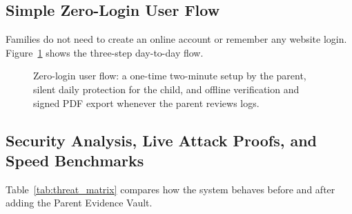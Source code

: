 \documentclass[11pt,a4paper]{article}
\begin{document}
\subsection{Simple Zero-Login User Flow}
Families do not need to create an online account or remember any website login. Figure~\ref{fig:user_flow} shows the three-step day-to-day flow.

\begin{figure}[H]
  \centering
  \resizebox{\textwidth}{!}{}
  \caption{Zero-login user flow: a one-time two-minute setup by the parent, silent daily protection for the child, and offline verification and signed PDF export whenever the parent reviews logs.}
  \label{fig:user_flow}
\end{figure}

\subsection{Security Analysis, Live Attack Proofs, and Speed Benchmarks}
Table~\ref{tab:threat_matrix} compares how the system behaves before and after adding the Parent Evidence Vault.
\end{document}
